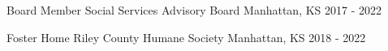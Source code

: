 
\begin{cventries}

  \cventry
    {Board Member} 
    {Social Services Advisory Board}
    {Manhattan, KS} %
    {2017 - 2022} %
    {
    }

  \cventry
    {Foster Home} %
    {Riley County Humane Society} %
    {Manhattan, KS} %
    {2018 - 2022} %
    {
    }

\end{cventries}